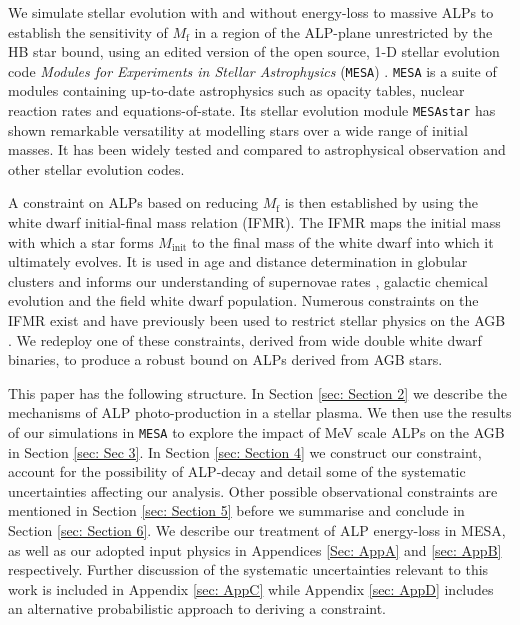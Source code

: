 We simulate stellar evolution with and without energy-loss to massive ALPs to establish the sensitivity of $M_{\mathrm{f}}$ in a region of the ALP-plane unrestricted by the HB star bound, using an edited version of the open source, 1-D stellar evolution code \textit{Modules for Experiments in Stellar Astrophysics} (\texttt{MESA})  \cite{MESA1, MESA2, MESA3, MESA4, MESA5}. \texttt{MESA} is a suite of modules containing up-to-date astrophysics such as opacity tables, nuclear reaction rates and equations-of-state. Its stellar evolution module \texttt{MESAstar} has shown remarkable versatility at modelling stars over a wide range of initial masses. It has been widely tested and compared to astrophysical observation and other stellar evolution codes.



A constraint on ALPs based on reducing $M_{\mathrm{f}}$ is then established by using the white dwarf initial-final mass relation (IFMR). The IFMR maps the initial mass with which a star forms $M_{\mathrm{init}}$ to the final mass of the white dwarf into which it ultimately evolves. It is used in age and distance determination in globular clusters and informs our understanding of supernovae rates \cite{Greggio-TypeIa}, galactic chemical evolution and the field white dwarf population. Numerous constraints on the IFMR exist \cite{Weidemann2000, Kalirai_2008, Williams2009, Andrews, cummings_2016, El-Badry, Cummings_2018} and have previously been used to restrict stellar physics on the AGB \cite{Cummings_2019}. We redeploy one of these constraints, derived from wide double white dwarf binaries, to produce a robust bound on ALPs derived from AGB stars.


This paper has the following structure. In Section \ref{sec: Section 2} we describe the mechanisms of ALP photo-production in a stellar plasma. We then use the results of our simulations in \texttt{MESA} to explore the impact of MeV scale ALPs on the AGB in Section \ref{sec: Sec 3}. In Section \ref{sec: Section 4} we construct our constraint, account for the possibility of ALP-decay and detail some of the systematic uncertainties affecting our analysis. Other possible observational constraints are mentioned in Section \ref{sec: Section 5} before we summarise and conclude in Section \ref{sec: Section 6}. We describe our treatment of ALP energy-loss in MESA, as well as our adopted input physics in Appendices \ref{Sec: AppA} and \ref{sec: AppB} respectively. Further discussion of the systematic uncertainties relevant to this work is included in Appendix \ref{sec: AppC} while Appendix \ref{sec: AppD} includes an alternative probabilistic approach to deriving a constraint.